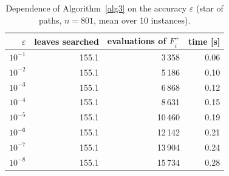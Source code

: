 \begin{table}[htbp]
\centering
\small
\caption{Dependence of Algorithm~\ref{alg3} on the accuracy $\varepsilon$ (star of paths, $n=801$, mean over 10 instances).}
\label{tab:eps}
\begin{tabular}{rrrr}
\hline
$\varepsilon$ & leaves searched & evaluations of $F_i^{+}$ & time [s] \\
\hline
$10^{-1}$ & 155.1 & 3\,358 & 0.06 \\
$10^{-2}$ & 155.1 & 5\,186 & 0.10 \\
$10^{-3}$ & 155.1 & 6\,868 & 0.12 \\
$10^{-4}$ & 155.1 & 8\,631 & 0.15 \\
$10^{-5}$ & 155.1 & 10\,460 & 0.19 \\
$10^{-6}$ & 155.1 & 12\,142 & 0.21 \\
$10^{-7}$ & 155.1 & 13\,904 & 0.24 \\
$10^{-8}$ & 155.1 & 15\,734 & 0.28 \\
\hline
\end{tabular}
\end{table}
